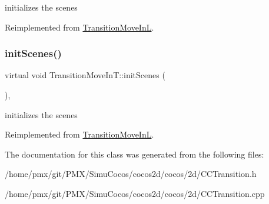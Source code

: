 initializes the scenes 

Reimplemented from \hyperlink{classTransitionMoveInL_aeb7630758110537b1098673f21d7d197}{Transition\+Move\+InL}.

\mbox{\label{classTransitionMoveInT_a25cb721d845913b43a385931ca1851f2}} 
\subsubsection{\texorpdfstring{init\+Scenes()}{initScenes()}\hspace{0.1cm}{\footnotesize\ttfamily [2/2]}}
{\footnotesize\ttfamily virtual void Transition\+Move\+In\+T\+::init\+Scenes (\begin{DoxyParamCaption}{ }\end{DoxyParamCaption})\hspace{0.3cm}{\ttfamily [protected]}, {\ttfamily [virtual]}}

initializes the scenes 

Reimplemented from \hyperlink{classTransitionMoveInL_aeb7630758110537b1098673f21d7d197}{Transition\+Move\+InL}.



The documentation for this class was generated from the following files\+:\begin{DoxyCompactItemize}
\item 
/home/pmx/git/\+P\+M\+X/\+Simu\+Cocos/cocos2d/cocos/2d/C\+C\+Transition.\+h\item 
/home/pmx/git/\+P\+M\+X/\+Simu\+Cocos/cocos2d/cocos/2d/C\+C\+Transition.\+cpp\end{DoxyCompactItemize}
